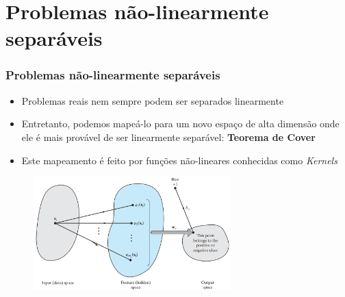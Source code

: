 \documentclass{beamer}
\begin{document}
\section{Problemas não-linearmente separáveis}
\begin{frame}
	\frametitle{Problemas não-linearmente separáveis}
	\begin{itemize}
		\item Problemas reais nem sempre podem ser separados linearmente
		\item Entretanto, podemos mapeá-lo para um novo espaço de alta dimensão onde ele é mais provável de ser linearmente separável: \textbf{Teorema de Cover} \cite{cover}
		\item Este mapeamento é feito por funções não-lineares conhecidas como \textit{Kernels}
	\end{itemize}
	\begin{figure}[h!]
		\centering
		\includegraphics[width=3in]{fig05.png}
		\label{fig:kernel-trick}
	\end{figure}
\end{frame}
\end{document}

